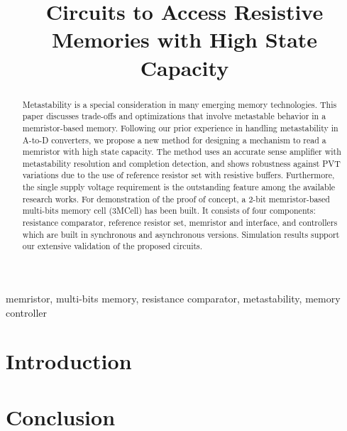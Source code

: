 \documentclass[twocolumn,conference]{IEEEtran}
\begin{document}
\title{Circuits to Access Resistive Memories with High State Capacity}

\maketitle

\begin{abstract}
Metastability is a special consideration in many emerging memory technologies. This paper discusses trade-offs and optimizations that involve metastable behavior in a memristor-based memory. Following our prior experience in handling metastability in A-to-D converters, we propose a new method for designing a mechanism to read a memristor with high state capacity. The method uses an accurate sense amplifier with metastability resolution and completion detection, and shows robustness against PVT variations due to the use of reference resistor set with resistive buffers. Furthermore, the single supply voltage requirement is the outstanding feature among the available research works.  For demonstration of the proof of concept, a 2-bit memristor-based multi-bits memory cell (3MCell) has been built. It consists of four components: resistance comparator, reference resistor set, memristor and interface, and controllers which are built in synchronous and asynchronous versions. Simulation results support our extensive validation of the proposed circuits.

\end{abstract}

\begin{IEEEkeywords}
memristor, multi-bits memory, resistance comparator, metastability, memory controller
\end{IEEEkeywords}

\section{Introduction}
\label{sec:introduction}
\cite{Bunnam-2017-PATMOS}


\section{Conclusion}
\label{sec:Conclusion}




\end{document}
